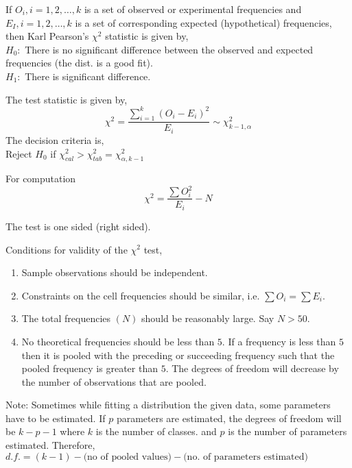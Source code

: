 \documentclass[oneside,11pt,pdftex]{book}%
\numberwithin{equation}{section}
\numberwithin{section}{chapter}
\numberwithin{equation}{chapter}
\begin{document}
If $ O_i, i=1,2,\dots, k $ is a set of observed or experimental frequencies and $ E_I, i=1,2,\dots,k$ is a set of corresponding expected (hypothetical) frequencies, then Karl Pearson's $ \chi^2 $ statistic is given by,\\
$ H_0: $ There is no significant difference between the observed and expected frequencies (the dist. is a good fit).\\
$ H_1: $ There is significant difference.

The test statistic is given by, 
\[ \chi^2=\frac{\sum_{i=1}^k (O_i-E_i)^2}{E_i} \sim \chi^2_{k-1,\alpha}\]
The decision criteria is,\\
Reject $ H_0 $ if $ \chi^2_{cal} > \chi^2_{tab}=\chi^2_{\alpha,k-1}$

For computation \[ \chi^2=\frac{\sum O_i^2}{E_i} - N\]

The test is one sided (right sided).

Conditions for validity of the $ \chi^2 $ test,
\begin{enumerate}
	\item Sample observations should be independent.
	\item Constraints on the cell frequencies should be similar, i.e. $ \sum O_i = \sum E_i $.
	\item The total frequencies $ (N) $ should be reasonably large. Say $ N>50 $.
	\item No theoretical frequencies should be less than $ 5 $. If a frequency is less than $ 5 $ then it is pooled with the preceding or succeeding frequency such that the pooled frequency is greater than $ 5 $. The degrees of freedom will decrease by the number of observations that are pooled.
\end{enumerate}

Note: Sometimes while fitting a distribution the given data, some parameters have to be estimated. If $ p $ parameters are estimated, the degrees of freedom will be $ k-p-1 $ where $ k $ is the number of classes. and $ p $ is the number of parameters estimated.
Therefore, $ d.f.=(k-1) - \text{(no of pooled values)}-\text{(no. of parameters estimated)}$
\end{document}

